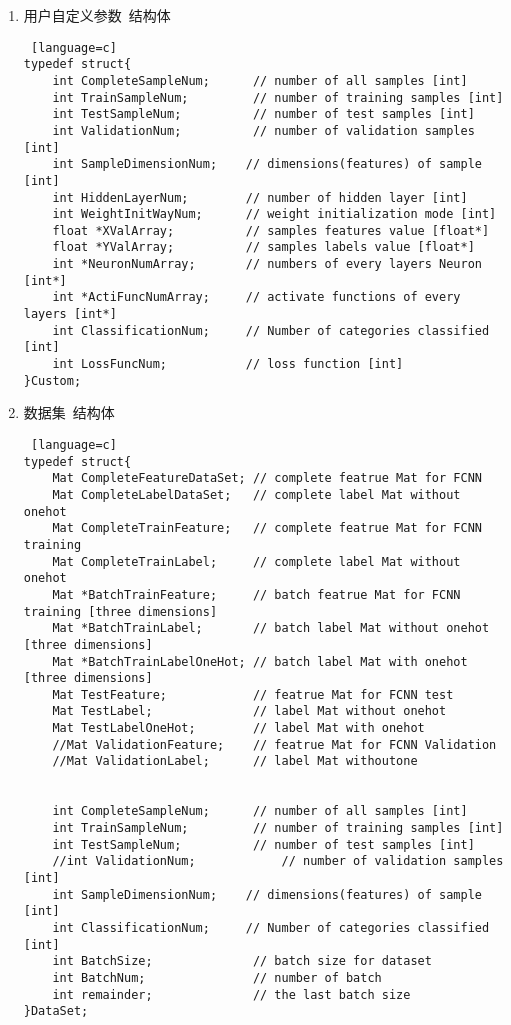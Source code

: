 \begin{enumerate}
\begin{lstlisting} [language=c]
	int ClassificationNum;     // Number of categories classified [int]
	int LossFuncNum;           // loss function [int]
}FCNN;
\end{lstlisting}
  \item 用户自定义参数~结构体
\begin{lstlisting} [language=c]
typedef struct{
    int CompleteSampleNum;		// number of all samples [int]
	int TrainSampleNum;			// number of training samples [int]
	int TestSampleNum;			// number of test samples [int]
	int ValidationNum;			// number of validation samples [int]
	int SampleDimensionNum;    // dimensions(features) of sample [int]
	int HiddenLayerNum;        // number of hidden layer [int]
	int WeightInitWayNum;      // weight initialization mode [int]
	float *XValArray;          // samples features value [float*]
	float *YValArray;          // samples labels value [float*]
	int *NeuronNumArray;       // numbers of every layers Neuron [int*]
	int *ActiFuncNumArray;     // activate functions of every layers [int*]
	int ClassificationNum;     // Number of categories classified [int]
	int LossFuncNum;           // loss function [int]
}Custom;
\end{lstlisting}

\item 数据集~结构体
\begin{lstlisting} [language=c]
typedef struct{
	Mat CompleteFeatureDataSet;	// complete featrue Mat for FCNN
	Mat CompleteLabelDataSet;	// complete label Mat without onehot
	Mat CompleteTrainFeature;	// complete featrue Mat for FCNN training
	Mat CompleteTrainLabel;		// complete label Mat without onehot
	Mat *BatchTrainFeature;		// batch featrue Mat for FCNN training [three dimensions]
	Mat *BatchTrainLabel;		// batch label Mat without onehot [three dimensions]
	Mat *BatchTrainLabelOneHot; // batch label Mat with onehot [three dimensions]
	Mat TestFeature;			// featrue Mat for FCNN test
	Mat TestLabel;				// label Mat without onehot
	Mat TestLabelOneHot;        // label Mat with onehot
	//Mat ValidationFeature;	// featrue Mat for FCNN Validation
	//Mat ValidationLabel;		// label Mat withoutone
	

	int CompleteSampleNum;		// number of all samples [int]
	int TrainSampleNum;			// number of training samples [int]
	int TestSampleNum;			// number of test samples [int]
	//int ValidationNum;			// number of validation samples [int]
	int SampleDimensionNum;    // dimensions(features) of sample [int]
	int ClassificationNum;     // Number of categories classified [int]
	int BatchSize;				// batch size for dataset
	int BatchNum;				// number of batch
	int remainder;				// the last batch size
}DataSet;
\end{lstlisting}
\end{enumerate}




